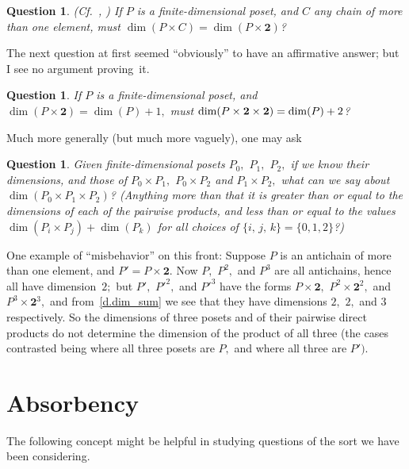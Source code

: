 \documentclass{amsart}
\newtheorem{question}[theorem]{Question}
\numberwithin{equation}{section}
\numberwithin{theorem}{section}
\newcommand{\2}{\mathbf{2}}
\begin{document}
\begin{question}\label{Q.2_vs_C}
\textup{(}Cf.~\cite{indep_of_n}, \cite[Conjecture 1]{KR}\textup{)}
If $P$ is a finite-dimensional poset, and $C$ any chain of
more than one element, must $\dim(P\times C) = \dim(P\times \2)$?
\end{question}

The next question at first seemed ``obviously'' to have
an affirmative answer; but I see no argument proving~it.

\begin{question}\label{Q.Px2x2}
If $P$ is a finite-dimensional poset,
and $\dim(P\times \2) = \dim(P) + 1,$
must $\dim(P\times\nolinebreak \2\times\nolinebreak \2) = \dim(P) + 2$?
\end{question}

Much more generally (but much more vaguely), one may ask

\begin{question}\label{Q.P123}
Given finite-dimensional posets
$P_0,$ $P_1,$ $P_2,$ if we know their dimensions,
and those of $P_0\times P_1,$ $P_0\times P_2$ and $P_1\times P_2,$
what can we say about $\dim(P_0\times P_1\times P_2)$?
\textup{(}Anything more than that it is greater than
or equal to the dimensions of each of
the pairwise products, and less than or equal to the values
$\dim(P_i\times P_j)+\dim(P_k)$ for
all choices of $\{i,\,j,\,k\}=\{0,1,2\}$?\textup{)}
\end{question}

One example of ``misbehavior'' on this front:
Suppose $P$ is an antichain of more than one element, and
$P'=P\times \2.$
Now $P,$ $P^2,$ and $P^3$ are all
antichains, hence all have dimension~$2;$
but $P',$ $P'^2,$ and $P'^3$
have the forms $P\times\2,$ $P^2\times \2^2,$ and $P^3\times \2^3,$
and from~\eqref{d.dim_sum} we see that they
have dimensions $2,$ $2,$ and $3$ respectively.
So the dimensions of three
posets and of their pairwise direct products do not
determine the dimension of the product of all three
(the cases contrasted being where all three posets are $P,$
and where all three are $P').$

\section{Absorbency}\label{S.abs}

The following concept might be helpful
in studying questions of the sort we have been considering.
\end{document}
